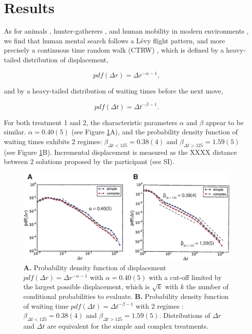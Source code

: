 \section{Results}

As for animals \cite{}, hunter-gatherers \cite{}, and human mobility in modern environments \cite{}, we find that human mental search follows a L\'evy flight pattern, and more precisely a continuous time random walk (CTRW) \cite{montroll_random_1965}, which is defined by a heavy-tailed distribution of displacement, 

\begin{equation}
\label{displacements}
pdf(\Delta r) = \Delta r^{-\alpha -1},
\end{equation}

and by a heavy-tailed distribution of waiting times before the next move, 

\begin{equation}
\label{wtimes}
pdf(\Delta t) = \Delta t^{-\beta -1}.
\end{equation}

For both treatment 1 and 2, the characteristic parameters $\alpha$ and $\beta$ appear to be similar. $\alpha = 0.40(5)$ (see Figure \ref{fig:CTRW}A), and the probability density function of waiting times exhibits 2 regimes:  $\beta_{\Delta t < 125} = 0.38(4)$ and $\beta_{\Delta t > 125} = 1.59(5)$ (see Figure \ref{fig:CTRW}B). Incremental displacement is measured as the XXXX distance between 2 solutions proposed by the participant (see SI).

\begin{figure}[h!]
\begin{center}
\includegraphics[width=17cm]{figures/CTRW.eps}
\caption{\footnotesize{{\bf A.} Probability density function of displacement $pdf(\Delta r) = \Delta r^{-\alpha -1}$ with $\alpha = 0.40(5)$ with a cut-off limited by the largest possible displacement, which is $\sqrt{k}$ with $k$ the number of conditional probabilities to evaluate. {\bf B.}  Probability density function of waiting time $pdf(\Delta t) = \Delta t^{-\beta -1}$ with 2 regimes : $\beta_{\Delta t < 125} = 0.38(4)$ and $\beta_{\Delta t > 125} = 1.59(5)$. Distributions of $\Delta r$ and $\Delta t$ are equivalent for the simple and complex treatments.}}
\label{fig:CTRW}
\end{center}
\end{figure}

